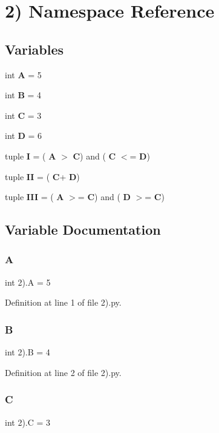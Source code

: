 \section{2) Namespace Reference}
\label{namespace2_08}
\subsection*{Variables}
\begin{DoxyCompactItemize}
\item 
int \textbf{ A} = 5
\item 
int \textbf{ B} = 4
\item 
int \textbf{ C} = 3
\item 
int \textbf{ D} = 6
\item 
tuple \textbf{ I} = (\textbf{ A} $>$ \textbf{ C}) and (\textbf{ C} $<$= \textbf{ D})
\item 
tuple \textbf{ II} = (\textbf{ C}+\textbf{ D})
\item 
tuple \textbf{ I\+II} = (\textbf{ A} $>$= \textbf{ C}) and (\textbf{ D} $>$= \textbf{ C})
\end{DoxyCompactItemize}


\subsection{Variable Documentation}
\mbox{\label{namespace2_08_a4f042d9c6a3bb4524a4e99d4d1e4b155}} 
\subsubsection{A}
{\footnotesize\ttfamily int 2).A = 5}



Definition at line 1 of file 2).\+py.

\mbox{\label{namespace2_08_ac185857faba6e85f721a41ae220bd67e}} 
\subsubsection{B}
{\footnotesize\ttfamily int 2).B = 4}



Definition at line 2 of file 2).\+py.

\mbox{\label{namespace2_08_a054ddcd4fec3812f908f65b9bf3fc399}} 
\subsubsection{C}
{\footnotesize\ttfamily int 2).C = 3}



